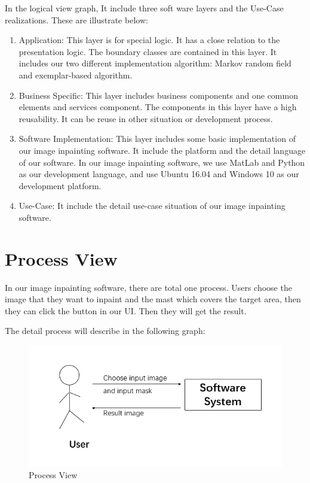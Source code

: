 \documentclass[12pt]{article}
\begin{document}
In the logical view graph, It include three soft ware layers and the Use-Case realizations. These are illustrate below:
\begin{enumerate}
	\item Application: This layer is for special logic. It has a close relation to the presentation logic. The boundary classes are contained in this layer. It includes our two different implementation algorithm: Markov random field and exemplar-based algorithm.
	\item Business Specific: This layer includes business components and one common elements and services component. The components in this layer have a high reusability. It can be reuse in other situation or development process.
	\item Software Implementation: This layer includes some basic implementation of our image inpainting software. It include the platform and the detail language of our software. In our image inpainting software, we use MatLab and Python as our development language, and use Ubuntu 16.04 and Windows 10 as our development platform.
	\item Use-Case: It include the detail use-case situation of our image inpainting software.
\end{enumerate}

\section{Process View}
\qquad In our image inpainting software, there are total one process. Users choose the image that they want to inpaint and the mast which covers the target area, then they can click the button in our UI. Then they will get the result. 

The detail process will describe in the following graph:
\begin{figure}[H]
	\centering
	\includegraphics[width=1.0\linewidth]{process.jpg}
	\caption{Process View}
\end{figure}
\end{document}
